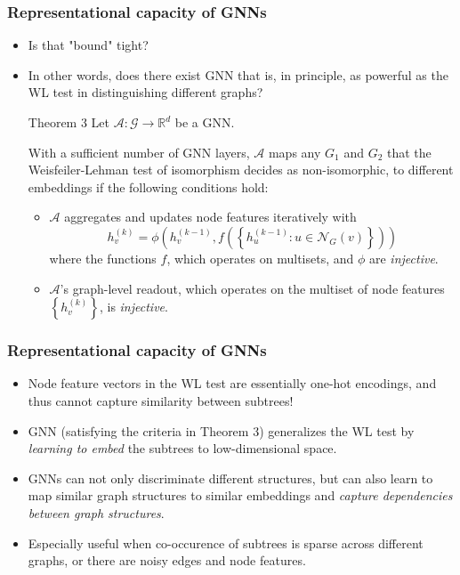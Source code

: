 \documentclass[handout]{beamer}
\begin{document}
\begin{frame}
\frametitle{Representational capacity of GNNs}

\begin{itemize}
	\item Is that "bound" tight? \pause
	
	\item In other words, does there exist GNN that is, in principle, as powerful as the WL test in distinguishing different graphs? \pause

\begin{block}{Theorem 3}
Let $\mathcal{A} : \mathcal{G} \rightarrow \mathbb{R}^d$ be a GNN.

With a sufficient number of GNN layers, $\mathcal{A}$ maps any $G_1$ and $G_2$ that the Weisfeiler-Lehman test of isomorphism decides as non-isomorphic, to different embeddings if the following conditions hold:

\begin{itemize}
\item $\mathcal{A}$ aggregates and updates node features iteratively with
$$h_v^{(k)} = \phi \left( h_v^{(k - 1)}, f \left( \left\{ h_u^{(k - 1)} : u \in \mathcal{N}_G(v) \right\} \right) \right)$$
where the functions $f$, which operates on multisets, and $\phi$ are {\it injective}.
\item $\mathcal{A}$'s graph-level readout, which operates on the multiset of node features $\left\{ h_v^{(k)} \right\}$, is {\it injective}.
\end{itemize}
\end{block}
\end{itemize}

\end{frame}

\begin{frame}
\frametitle{Representational capacity of GNNs}

\begin{itemize}
	\item Node feature vectors in the WL test are essentially one-hot encodings, and thus cannot capture similarity between subtrees! \pause
	
	\item GNN (satisfying the criteria in Theorem 3) generalizes the WL test by {\it learning to embed} the subtrees to low-dimensional space. \pause
	
	\item GNNs can not only discriminate different structures, but can also \alert{learn to map similar graph structures to similar embeddings and {\it capture dependencies between graph structures}}. \pause
	
	\item Especially useful when co-occurence of subtrees is sparse across different graphs, or there are noisy edges and node features.
\end{itemize}

\end{frame}
\end{document}
